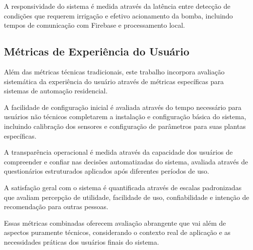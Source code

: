\documentclass[twoside,english,brazilian]{UNISINOSmonografia}
\begin{document}
A responsividade do sistema é medida através da latência entre detecção de condições que requerem irrigação e efetivo acionamento da bomba, incluindo tempos de comunicação com Firebase e processamento local.

\subsection{Métricas de Experiência do Usuário}

Além das métricas técnicas tradicionais, este trabalho incorpora avaliação sistemática da experiência do usuário através de métricas específicas para sistemas de automação residencial.

A facilidade de configuração inicial é avaliada através do tempo necessário para usuários não técnicos completarem a instalação e configuração básica do sistema, incluindo calibração dos sensores e configuração de parâmetros para suas plantas específicas.

A transparência operacional é medida através da capacidade dos usuários de compreender e confiar nas decisões automatizadas do sistema, avaliada através de questionários estruturados aplicados após diferentes períodos de uso.

A satisfação geral com o sistema é quantificada através de escalas padronizadas que avaliam percepção de utilidade, facilidade de uso, confiabilidade e intenção de recomendação para outras pessoas.


Essas métricas combinadas oferecem avaliação abrangente que vai além de aspectos puramente técnicos, considerando o contexto real de aplicação e as necessidades práticas dos usuários finais do sistema.
\end{document}
